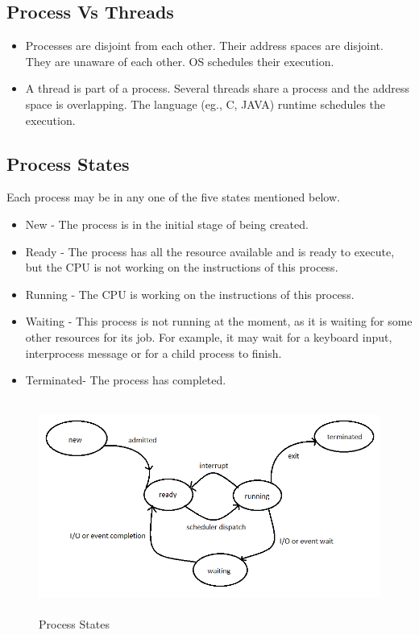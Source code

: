 \documentclass[12pt]{report}
\begin{document}
\subsection{Process Vs Threads}
\begin{itemize}
	\item  Processes are disjoint from each other. Their address spaces are disjoint. They are unaware of each other. OS schedules their execution.
	\item  A thread is part of a process. Several threads share a process and the address space is overlapping. The language (eg., C, JAVA) runtime schedules the execution. 
\end{itemize}

\subsection{Process States}
Each process may be in any one of the five states mentioned below.
\begin{itemize}
	\item New       - The process is in the initial stage of being created.
	\item Ready     - The process has all the resource available and is ready to execute, but the CPU is not working on the instructions of this process.
	\item Running   - The CPU is working on the instructions of this process.
	\item Waiting   - This process is not running at the moment, as it is waiting for some other resources for its job.  For example, it may wait for a keyboard input, interprocess message or for a child process to finish.
	\item Terminated- The process has completed.  
\end{itemize}

\begin{figure}
	\centering
	\includegraphics[width=1.0\textwidth,width=15cm,height=7cm]{process_states.png}
	\caption{Process States}
\end{figure}
\end{document}
